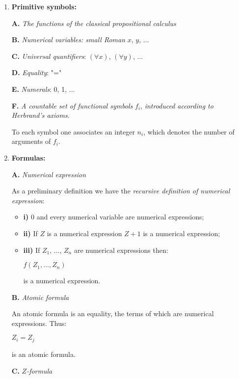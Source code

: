 \documentclass[12pt]{article}
\begin{document}
\begin{enumerate}
\item \textbf{Primitive symbols:}

\textbf{A.} \emph{The functions of the classical propositional calculus}

\textbf{B.} \emph{Numerical variables: small Roman} $x$, $y$, $\ldots$

\textbf{C.} \emph{Universal quantifiers}: $(\forall x)$, $(\forall y)$, $\ldots$

\textbf{D.} \emph{Equality}: "=" 

\textbf{E.} \emph{Numerals}: 0, 1, $\ldots$

\textbf{F.} \emph{A countable set of functional symbols} $f_i$, \emph{introduced according to Herbrand's axioms}. 

To each symbol one associates an integer $n_i$, which denotes the number of arguments of $f_i$.

\item \textbf{Formulas:}

\textbf{A.} \emph{Numerical expression}

As a preliminary definition we have the \emph{recursive definition of numerical expression}:

\begin{itemize}
\item \textbf{i)} 0 and every numerical variable are numerical expressions;

\item \textbf{ii)} If $Z$ is a numerical expression $Z + 1$ is a numerical expression;

\item \textbf{iii)} If $Z_1$, $\ldots$, $Z_n$ are numerical expressions then:

\begin{center}
$f (Z_1, \ldots, Z_n)$
\end{center}

is a numerical expression.
\end{itemize}

\textbf{B.} \emph{Atomic formula}

An atomic formula is an equality, the terms of which are numerical expressions. Thus:

\begin{center}
$Z_i = Z_j$
\end{center}

is an atomic formula.

\textbf{C.} \emph{$Z$-formula}


\end{enumerate}
\end{document}
